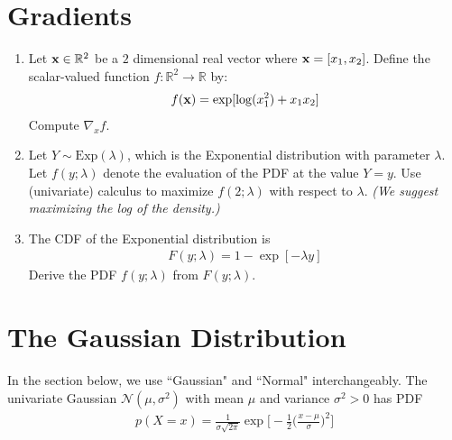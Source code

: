 \documentclass[11pt]{article}
\begin{document}
\newpage 


\section{Gradients}
\begin{enumerate}[label=(\Alph*)]
	        \item Let ${\mathbf x} \in \mathbb{R}^2$ be a $2$ dimensional real vector where ${\mathbf x} = [x_1,x_2]$.
	        Define the scalar-valued function $f: \mathbb{R}^2 \to \mathbb{R}$ by:
	        \begin{align*}
	            f({\mathbf x}) = \exp[\log(x_1^2) + x_1 x_2]
	        \end{align*}
	        Compute $\nabla_x f$.
	        
	         \item Let $Y \sim \text{Exp}(\lambda)$, which is the Exponential distribution with parameter $\lambda$. Let $f(y;\lambda)$ denote the evaluation of the PDF at the value $Y=y$. Use (univariate) calculus to maximize $f(2;\lambda)$ with respect to $\lambda$. \textit{(We suggest maximizing the log of the density.)}
	        
	        \item The CDF of the Exponential distribution is 
	        \begin{align*}
	            F(y;\lambda) = 1 - \exp[- \lambda y]
	        \end{align*}
	        Derive the PDF $f(y;\lambda)$ from $F(y;\lambda)$.
	        

\end{enumerate} 


\newpage 
\section{The Gaussian Distribution}

In the section below, we use ``Gaussian" and ``Normal" interchangeably. The univariate Gaussian $\mathcal{N}(\mu,\sigma^2)$ with mean $\mu$ and variance $\sigma^2>0$ has PDF
\begin{align*}
    p(X=x)= \frac{1}{\sigma \sqrt{2 \pi}}\exp\Big[-\frac{1}{2}\Big(\frac{x-\mu}{\sigma}\Big)^2\Big]
\end{align*}
   
\end{document}
